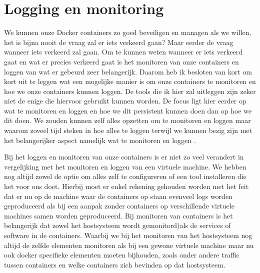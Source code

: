 \chapter{Logging en monitoring}

We kunnen onze Docker containers zo goed beveiligen en managen als we willen, het is bijna nooit de vraag zal er iets verkeerd gaan? Maar eerder de vraag wanneer iets verkeerd zal gaan. Om te kunnen weten wanneer er iets verkeerd gaat en wat er precies verkeerd gaat is het monitoren van onze containers en loggen van wat er gebeurd zeer belangerijk. Daarom heb ik besloten van kort om kort uit te leggen wat een mogelijke manier is om onze containers te monitoren en hoe we onze containers kunnen loggen. De tools die ik hier zal uitleggen zijn zeker niet de enige die hiervoor gebruikt kunnen worden. De focus ligt hier eerder op wat te monitoren en loggen en hoe we dit persistent kunnen doen dan op hoe we dit doen. We zouden kunnen zelf alles opzetten om te monitoren en loggen maar waarom zoveel tijd steken in hoe alles te loggen terwijl we kunnen bezig zijn met het belangerijker aspect namelijk wat te monitoren en loggen . 

Bij het loggen en monitoren van onze containers is er niet zo veel verandert in vergelijking met het monitoren en loggen van een virtuele machine. We hebben nog altijd zowel de optie om alles zelf te configureren of een tool installeren die het voor ons doet. Hierbij moet er enkel rekening gehouden worden met het feit dat er nu op de machine waar de containers op staan evenveel logs worden geproduceerd als bij een aanpak zonder containers op verschillende virtuele machines samen worden geproduceerd. Bij monitoren van containers is het belangerijk dat zowel het hostsysteem wordt gemonitord)als de services of software in de containers. Waarbij we bij het monitoren van het hostsysteem nog altijd de zelfde elementen monitoren als bij een gewone virtuele machine maar nu ook docker specifieke elementen moeten bijhouden, zoals onder andere traffic tussen containers en welke containers zich bevinden op dat hostsysteem.